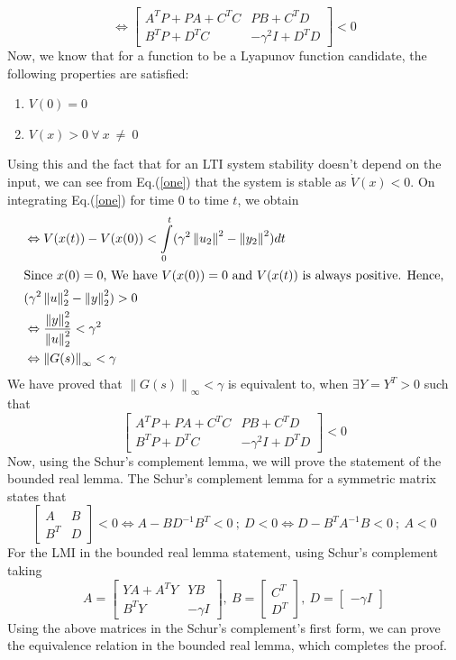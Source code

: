 \documentclass[a4paper,12pt]{article}
\newcommand\norm[1]{\left\lVert#1\right\rVert}
\begin{document}
		\[
		\Leftrightarrow
		\begin{bmatrix}
		A^{T}P+PA+C^{T}C & PB+C^{T}D \\
		B^{T}P+D^{T}{C} & -\gamma^{2} I + D^{T}D
		\end{bmatrix}
		< 0
		\]
		Now, we know that for a function to be a Lyapunov function candidate, the following properties are satisfied:
		\begin{enumerate}
		\label{ly}
		\item $V(0)=0$ 
		\item $V(x)>0\: \forall\: x\:\neq\:0$
		\end{enumerate}Using this and the fact that for an LTI system stability doesn't depend on the input, we can see from Eq.(\ref{one}) that the system is stable as $\dot{V}(x) < 0$. On integrating Eq.(\ref{one}) for time $0$ to time $t$, we obtain
		\begin{align}
		&\Leftrightarrow V(x(t))-V(x(0)) < \int\limits_{0}^{t} (\gamma^{2}\norm{{u}_{2}}^{2} - \norm{{y}_{2}}^{2}) dt\\
		\intertext{Since $x(0)=0$, We have $V(x(0))=0$ and $V(x(t))$ is always positive. Hence,}
		&(\gamma^{2}\norm{u}_{2}^{2} - \norm{y}_{2}^{2}) > 0\\
		&\Leftrightarrow\frac{\norm{y}_{2}^{2}}{\norm{u}_{2}^{2}} < \gamma^{2}\\
		&\Leftrightarrow\norm{G(s)}_{\infty} < \gamma
		\end{align}
		We have proved that $\norm{G(s)}_{\infty} < \gamma$ is equivalent to, when $\exists Y=Y^{T} > 0$ such that 
		\[		
		\begin{bmatrix}
		A^{T}P+PA+C^{T}C & PB+C^{T}D \\
		B^{T}P+D^{T}{C} & -\gamma^{2} I + D^{T}D
		\end{bmatrix}
		< 0
		\]
		Now, using the Schur's complement lemma, we will prove the statement of the bounded real lemma. The Schur's complement lemma for a symmetric matrix states that
		\[
		\begin{bmatrix}
		A & B \\ B^{T} & D
		\end{bmatrix}
		< 0
		\Leftrightarrow
		A-BD^{-1}B^{T} < 0\: ; \:D < 0
		\Leftrightarrow
		D-B^{T}A^{-1}B < 0 \: ; \: A < 0
		\]
		For the LMI in the bounded real lemma statement, using Schur's complement taking 
		\[
		A=
		\begin{bmatrix}
		YA+A^{T}Y & YB \\
		B^{T}Y & -\gamma I 
		\end{bmatrix}
		,\:B=
		\begin{bmatrix}
		 C^{T} \\
		D^{T}
		\end{bmatrix}
		,\:D=
		\begin{bmatrix}
		-\gamma I
		\end{bmatrix}
		\]
		Using the above matrices in the Schur's complement's first form, we can prove the equivalence relation in the bounded real lemma, which completes the proof.\\
\end{document}
